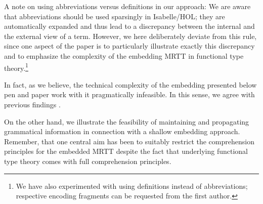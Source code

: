 \begin{isabellebody}
\begin{isamarkuptext}
  A note on using abbreviations versus definitions in our approach:  We are aware that abbreviations should
  be used sparsingly in Isabelle/HOL; they are automatically expanded and thus lead to a discrepancy 
  between the internal and the external view of a term. However, we here deliberately deviate from this
  rule, since one aspect of the paper is to particularly illustrate exactly this discrepancy and to emphasize the complexity
  of the embedding MRTT in functional type theory.\footnote{We have also 
  experimented with using definitions instead of abbreviations; respective 
  encoding fragments can be requested from the first author.} 

  In fact, as we believe, the technical  complexity of the embedding presented below  pen and paper 
  work with it pragmatically infeasible. In this sense, we agree with previous 
  findings \cite{zalta11:_relat_versus_funct_found_logic}. 

  On the other hand, we illustrate the feasibility of maintaining and propagating 
  grammatical information in connection with a shallow
  embedding approach. Remember, that one central aim has been to suitably
  restrict the comprehension principles for the embedded MRTT despite the fact that underlying functional 
  type theory comes with full comprehension principles.  
 

\end{isamarkuptext}
\end{isabellebody}

